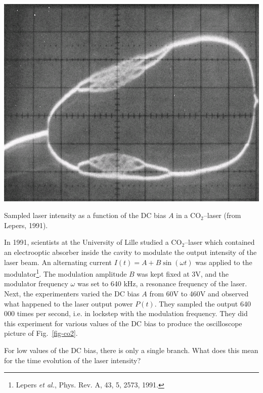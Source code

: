 \begin{marginfigure}
\centering
\includegraphics{dynamic/figures/CO2_chaos}
\caption{Sampled laser intensity as a function of the DC bias $A$ in a CO$_2$--laser (from Lepers, 1991).}
\label{fig-co2}
\end{marginfigure}

In 1991, scientists at the University of Lille studied a CO$_2$--laser which contained an electrooptic absorber inside the cavity to modulate the output intensity of the laser beam. An alternating current $I(t)=A+B \sin (\omega t)$ was applied to the modulator\footnote{Lepers \emph{et al.}, Phys. Rev. A, 43, 5, 2573, 1991.}. The modulation amplitude $B$ was kept fixed at 3V, and the modulator frequency $\omega$ was set to 640 kHz, a resonance frequency of the laser. Next, the experimenters varied the DC bias $A$ from 60V to 460V and observed what happened to the laser output power $P(t)$. They sampled the output 640 000 times per second, i.e. in lockstep with the modulation frequency. They did this experiment for various values of the DC bias to produce the oscilloscope picture of Fig.~\ref{fig-co2}.

\begin{cue}
For low values of the DC bias, there is only a single branch. What does this mean for the time evolution of the laser intensity?
\end{cue}

